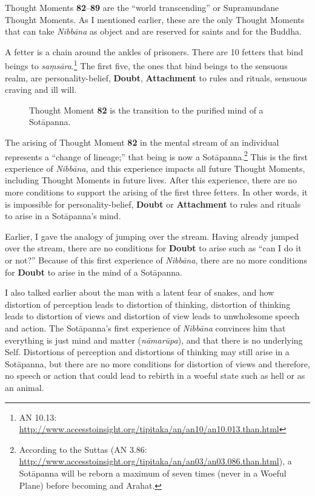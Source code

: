 Thought Moments \textbf{82}--\textbf{89} are the “world transcending” or Supramundane Thought Moments. As I mentioned earlier, these are the only Thought Moments that can take \textit{Nibbāna} as object and are reserved for saints and for the Buddha.

A fetter is a chain around the ankles of prisoners. There are 10 fetters that bind beings to \textit{saṃsāra}.\footnote{AN 10.13: \url{http://www.accesstoinsight.org/tipitaka/an/an10/an10.013.than.html}} The first five, the ones that bind beings to the sensuous realm, are personality-belief, \textbf{Doubt}, \textbf{Attachment} to rules and rituals, sensuous craving and ill will.

\begin{figure}[H]
\centering

\caption{Thought Moment \textbf{82} is the transition to the purified mind of a Sotāpanna.}
\label{fig:Magga}
\end{figure}

The arising of Thought Moment \textbf{82} in the mental stream of an individual represents a “change of lineage;” that being is now a Sotāpanna.\footnote{According to the Suttas (AN 3.86: \url{http://www.accesstoinsight.org/tipitaka/an/an03/an03.086.than.html}), a Sotāpanna will be reborn a maximum of seven times (never in a Woeful Plane) before becoming and Arahat.} This is the first experience of \textit{Nibbāna}, and this experience impacts all future Thought Moments, including Thought Moments in future lives. After this experience, there are no more conditions to support the arising of the first three fetters. In other words, it is impossible for personality-belief, \textbf{Doubt} or \textbf{Attachment} to rules and rituals to arise in a Sotāpanna’s mind.

Earlier, I gave the analogy of jumping over the stream. Having already jumped over the stream, there are no conditions for \textbf{Doubt} to arise such as “can I do it or not?” Because of this first experience of \textit{Nibbāna}, there are no more conditions for \textbf{Doubt} to arise in the mind of a Sotāpanna.

I also talked earlier about the man with a latent fear of snakes, and how distortion of perception leads to distortion of thinking, distortion of thinking leads to distortion of views and distortion of view leads to unwholesome speech and action. The Sotāpanna’s first experience of \textit{Nibbāna} convinces him that everything is just mind and matter (\textit{nāmarūpa}), and that there is no underlying Self. Distortions of perception and distortions of thinking may still arise in a Sotāpanna, but there are no more conditions for distortion of views and therefore, no speech or action that could lead to rebirth in a woeful state such as hell or as an animal.

